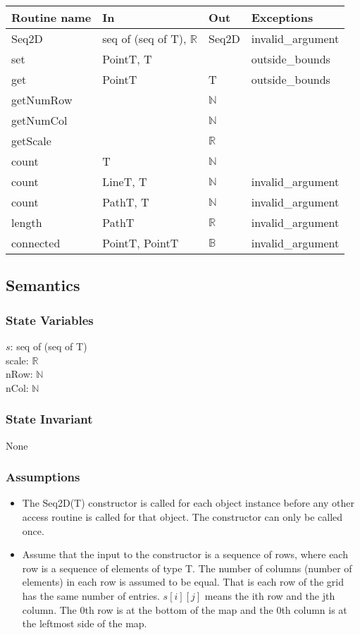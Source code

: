 \documentclass[12pt]{article}
\begin{document}
\begin{tabular}{| l | l | l | p{5cm} |}
\hline
\textbf{Routine name} & \textbf{In} & \textbf{Out} & \textbf{Exceptions}\\
\hline
Seq2D & seq of (seq of T), $\mathbb{R}$ & Seq2D & invalid\_argument\\
\hline
set & PointT, T & ~ & outside\_bounds\\
\hline
get & PointT & T & outside\_bounds\\
\hline
getNumRow & ~ & $\mathbb{N}$ & \\
\hline
getNumCol & ~ & $\mathbb{N}$ & \\
\hline
getScale & ~ & $\mathbb{R}$ & \\
\hline
count & T & $\mathbb{N}$ & \\
\hline
count & LineT, T & $\mathbb{N}$ & invalid\_argument\\
\hline
count & PathT, T & $\mathbb{N}$ & invalid\_argument\\
\hline
length & PathT & $\mathbb{R}$ & invalid\_argument\\
\hline
connected & PointT, PointT & $\mathbb{B}$ & invalid\_argument\\
\hline
\end{tabular}

\subsection* {Semantics}

\subsubsection* {State Variables}

$s$: seq of (seq of T)\\
scale: $\mathbb{R}$\\
nRow: $\mathbb{N}$\\
nCol: $\mathbb{N}$

\subsubsection* {State Invariant}

None

\subsubsection* {Assumptions}

\begin{itemize}
\item The Seq2D(T) constructor is called for each object instance before any
other access routine is called for that object.  The constructor can only be
called once.
\item Assume that the input to the constructor is a sequence of rows, where each
  row is a sequence of elements of type T.  The number of columns (number of
  elements) in each row is assumed to be equal. That is each row
  of the grid has the same number of entries.  $s[i][j]$ means the ith row and
  the jth column.  The 0th row is at the bottom of the map and the 0th column
  is at the leftmost side of the map.
\end{itemize}
\end{document}
